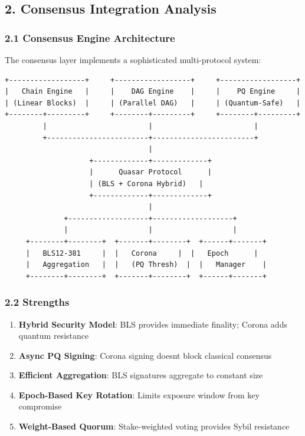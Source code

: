 \documentclass[
]{article}
\providecommand{\tightlist}{%
  \setlength{\itemsep}{0pt}\setlength{\parskip}{0pt}}
\begin{document}
\subsection{2. Consensus Integration
Analysis}\label{2-consensus-integration-analysis}

\subsubsection{2.1 Consensus Engine
Architecture}\label{21-consensus-engine-architecture}

The consensus layer implements a sophisticated multi-protocol system:

\begin{verbatim}
+------------------+     +------------------+     +------------------+
|   Chain Engine   |     |    DAG Engine    |     |    PQ Engine     |
| (Linear Blocks)  |     | (Parallel DAG)   |     | (Quantum-Safe)   |
+--------+---------+     +--------+---------+     +--------+---------+
         |                        |                        |
         +------------------------+------------------------+
                                  |
                    +-------------+-------------+
                    |      Quasar Protocol      |
                    | (BLS + Corona Hybrid)   |
                    +-------------+-------------+
                                  |
              +-------------------+-------------------+
              |                   |                   |
     +--------+--------+  +-------+--------+  +------+-------+
     |   BLS12-381     |  |   Corona     |  |   Epoch      |
     |   Aggregation   |  |   (PQ Thresh)  |  |   Manager    |
     +--------+--------+  +-------+--------+  +------+-------+
\end{verbatim}

\subsubsection{2.2 Strengths}\label{22-strengths}

\begin{enumerate}
\def\labelenumi{\arabic{enumi}.}
\tightlist
\item
  \textbf{Hybrid Security Model}: BLS provides immediate finality;
  Corona adds quantum resistance
\item
  \textbf{Async PQ Signing}: Corona signing doesn\textquotesingle t
  block classical consensus
\item
  \textbf{Efficient Aggregation}: BLS signatures aggregate to constant
  size
\item
  \textbf{Epoch-Based Key Rotation}: Limits exposure window from key
  compromise
\item
  \textbf{Weight-Based Quorum}: Stake-weighted voting provides Sybil
  resistance
\end{enumerate}
\end{document}
